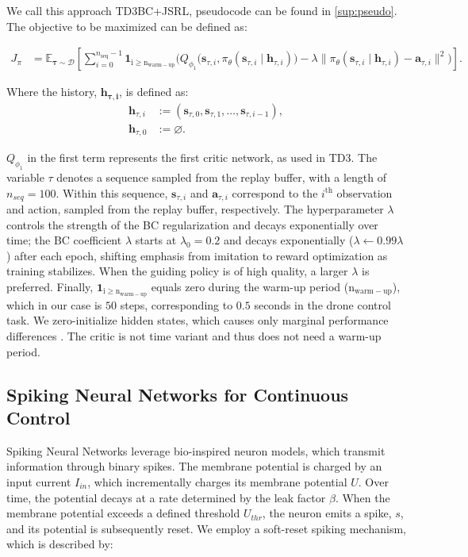 We call this approach TD3BC+JSRL, pseudocode can be found in \autoref{sup:pseudo}. The objective to be maximized can be defined as:

\begin{align}
    J_{\pi}
    &= \mathbb{E}_{\mathbf{\tau} \sim \mathcal{D}}
    \left[
        \sum_{i=0}^{n_{\text{seq}}-1}
        \mathbf{1}_{\mathrm{i\geq n_{warm-up}}}
        \Big(
            Q_{\phi_1}\big(
                \mathbf{s}_{\tau,i},
                \pi_{\theta}(\mathbf{s}_{\tau,i} \mid \mathbf{h}_{\tau,i})
            \big)
            - \lambda
            \big\|
                \pi_{\theta}(\mathbf{s}_{\tau,i} \mid \mathbf{h}_{\tau,i})
                - \mathbf{a}_{\tau,i}
            \big\|^2
        \Big)
    \right].
\end{align}


Where the history, $\mathbf{h_{\tau, i}}$, is defined as:
\begin{align}
    \mathbf{h}_{\tau,i} &:= (\mathbf{s}_{\tau,0}, \mathbf{s}_{\tau,1}, \dots, \mathbf{s}_{\tau,i-1}), \\
    \mathbf{h}_{\tau,0} &:= \varnothing.
\end{align}


\( Q_{\phi_1} \) in the first term represents the first critic network, as used in TD3. The variable \( \tau \) denotes a sequence sampled from the replay buffer, with a length of $n_{seq}=100$. Within this sequence, \( \mathbf{s}_{\tau,i} \) and \( \mathbf{a}_{\tau,i} \) correspond to the \( i^\text{th} \) observation and action, sampled from the replay buffer, respectively. The hyperparameter \( \lambda \) controls the strength of the BC regularization and decays exponentially over time; the BC coefficient $\lambda$ starts at $\lambda_0 = 0.2$ and decays exponentially ($\lambda \leftarrow 0.99\lambda$) after each epoch, shifting emphasis from imitation to reward optimization as training stabilizes.
When the guiding policy is of high quality, a larger \( \lambda \) is preferred. Finally, \( \mathbf{1}_\mathrm{i\geq n_{warm-up}} \) equals zero during the warm-up period ($\mathrm{n_{warm-up}}$), which in our case is $50$ steps, corresponding to $0.5$ seconds in the drone control task. We zero-initialize hidden states, which causes only marginal performance differences \cite{Kapturowski2019}. The critic is not time variant and thus does not need a warm-up period.

\subsection{Spiking Neural Networks for Continuous Control}\label{subsection:S-AC}
Spiking Neural Networks leverage bio-inspired neuron models, which transmit information through binary spikes. The membrane potential is charged by an input current \( I_{in} \), which incrementally charges its membrane potential \( U \). Over time, the potential decays at a rate determined by the leak factor \( \beta \). When the membrane potential exceeds a defined threshold \( U_{thr} \), the neuron emits a spike, \( s\), and its potential is subsequently reset. We employ a soft-reset spiking mechanism, which is described by:

